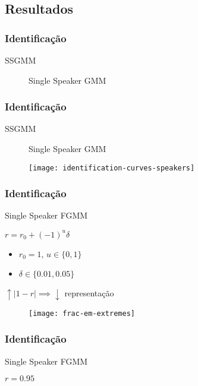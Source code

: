 \subsection{Resultados}

\begin{frame}
\frametitle{Identificação}
\begin{description}
    \item[SSGMM] Single Speaker GMM
\end{description}


\end{frame}

\begin{frame}
\frametitle{Identificação}
\begin{description}
    \item[SSGMM] Single Speaker GMM
\end{description}

\begin{figure}[ht]
    \centering
    \texttt{[image: identification-curves-speakers]}
\end{figure}
\end{frame}

\begin{frame}
\frametitle{Identificação}
\begin{description}
    \item[SSFGMM] Single Speaker FGMM
    \pause
    \item $r = r_0 + (-1)^u\delta$
    \pause
    \begin{itemize}
        \item $r_0 = 1$, $u \in \{0, 1\}$
        \pause
        \item $\delta \in \{0.01, 0.05\}$
        \pause
    \end{itemize}
    \item $\uparrow |1 - r| \implies \downarrow$ representação
    \pause
\end{description}

\begin{figure}[ht]
    \centering
    \texttt{[image: frac-em-extremes]}
\end{figure}
\end{frame}

\begin{frame}
\frametitle{Identificação}
\begin{description}
    \item[SSFGMM] Single Speaker FGMM
    \item $r = 0.95$
\end{description}


\end{frame}

